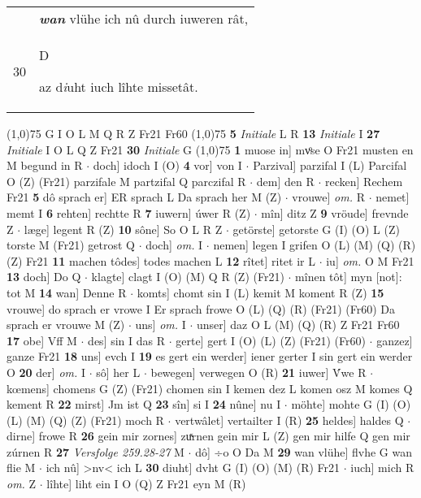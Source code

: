 \documentclass[8pt,a4paper,notitlepage]{article}
\begin{document}
\begin{table}[ht]
\begin{minipage}[t]{0.5\linewidth}
\begin{tabular}{rl}
 & \textit{\textbf{wan}} vlühe ich nû durch iuweren rât,\\ 
30 & \begin{large}D\end{large}az d\textit{i}uht iuch lîhte missetât.\\ 
\end{tabular}
\scriptsize
\line(1,0){75} \newline
G I O L M Q R Z Fr21 Fr60 \newline
\line(1,0){75} \newline
\textbf{5} \textit{Initiale} L R  \textbf{13} \textit{Initiale} I  \textbf{27} \textit{Initiale} I O L Q Z Fr21  \textbf{30} \textit{Initiale} G  \newline
\line(1,0){75} \newline
\textbf{1} muose in] mvͦse O Fr21 musten en M begund in R  $\cdot$ doch] idoch I (O) \textbf{4} vor] von I  $\cdot$ Parzival] parzifal I (L) Parcifal O (Z) (Fr21) parzifale M partzifal Q parczifal R  $\cdot$ dem] den R  $\cdot$ recken] Rechem Fr21 \textbf{5} dô sprach er] ER sprach L Da sprach her M (Z)  $\cdot$ vrouwe] \textit{om.} R  $\cdot$ nemet] memt I \textbf{6} rehten] rechtte R \textbf{7} iuwern] úwer R (Z)  $\cdot$ mîn] ditz Z \textbf{9} vröude] frevnde Z  $\cdot$ læge] legent R (Z) \textbf{10} sône] So O L R Z  $\cdot$ getörste] getorste G (I) (O) L (Z) torste M (Fr21) getrost Q  $\cdot$ doch] \textit{om.} I  $\cdot$ nemen] legen I grifen O (L) (M) (Q) (R) (Z) Fr21 \textbf{11} machen tôdes] todes machen L \textbf{12} rîtet] ritet ir L  $\cdot$ iu] \textit{om.} O M Fr21 \textbf{13} doch] Do Q  $\cdot$ klagte] clagt I (O) (M) Q R (Z) (Fr21)  $\cdot$ mînen tôt] myn [not]: tot M \textbf{14} wan] Denne R  $\cdot$ komts] chomt sin I (L) kemit M koment R (Z) \textbf{15} vrouwe] do sprach er vrowe I Er sprach frowe O (L) (Q) (R) (Fr21) (Fr60) Da sprach er vrouwe M (Z)  $\cdot$ uns] \textit{om.} I  $\cdot$ unser] daz O L (M) (Q) (R) Z Fr21 Fr60 \textbf{17} obe] Vff M  $\cdot$ des] sin I das R  $\cdot$ gerte] gert I (O) (L) (Z) (Fr21) (Fr60)  $\cdot$ ganzez] ganze Fr21 \textbf{18} uns] evch I \textbf{19} es gert ein werder] iener gerter I sin gert ein werder O \textbf{20} der] \textit{om.} I  $\cdot$ sô] her L  $\cdot$ bewegen] verwegen O (R) \textbf{21} iuwer] V́we R  $\cdot$ kœmens] chomens G (Z) (Fr21) chomen sin I kemen dez L komen osz M komes Q kement R \textbf{22} mirst] Jm ist Q \textbf{23} sîn] si I \textbf{24} nûne] nu I  $\cdot$ möhte] mohte G (I) (O) (L) (M) (Q) (Z) (Fr21) moch R  $\cdot$ vertwâlet] vertailter I (R) \textbf{25} heldes] haldes Q  $\cdot$ dirne] frowe R \textbf{26} gein mir zornes] zuͯrnen gein mir L (Z) gen mir hilfe Q gen mir zúrnen R \textbf{27} \textit{Versfolge 259.28-27} M   $\cdot$ dô] ÷o O Da M \textbf{29} wan vlühe] flvhe G wan flie M  $\cdot$ ich nû] >nv< ich L \textbf{30} diuht] dvht G (I) (O) (M) (R) Fr21  $\cdot$ iuch] mich R \textit{om.} Z  $\cdot$ lîhte] liht ein I O (Q) Z Fr21 eyn M (R) \newline

\end{minipage}
\end{table}
\end{document}
